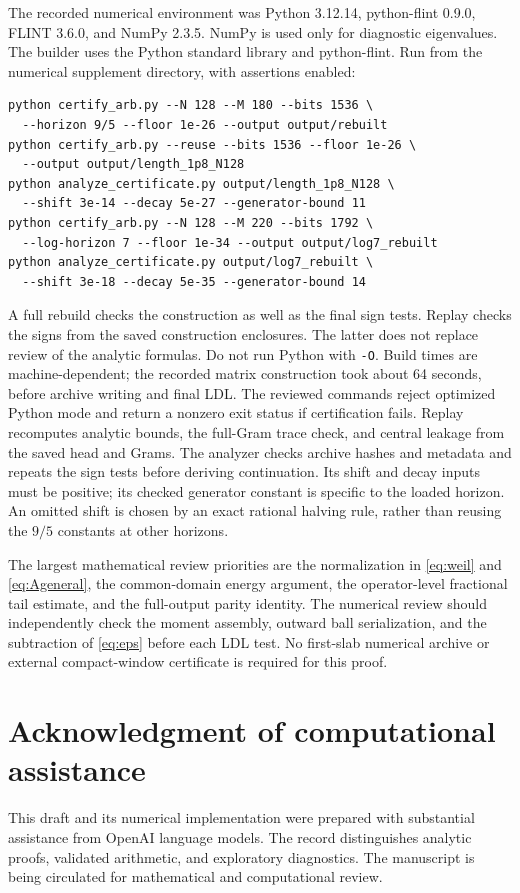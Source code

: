 \documentclass[11pt]{article}
\numberwithin{equation}{section}
\theoremstyle{definition}
\theoremstyle{remark}
\begin{document}
The recorded numerical environment was Python 3.12.14, python-flint 0.9.0,
FLINT 3.6.0, and NumPy 2.3.5. NumPy is used only for diagnostic eigenvalues.
The builder uses the Python standard library and python-flint. Run from
the numerical supplement directory, with assertions enabled:
\begin{verbatim}
python certify_arb.py --N 128 --M 180 --bits 1536 \
  --horizon 9/5 --floor 1e-26 --output output/rebuilt
python certify_arb.py --reuse --bits 1536 --floor 1e-26 \
  --output output/length_1p8_N128
python analyze_certificate.py output/length_1p8_N128 \
  --shift 3e-14 --decay 5e-27 --generator-bound 11
python certify_arb.py --N 128 --M 220 --bits 1792 \
  --log-horizon 7 --floor 1e-34 --output output/log7_rebuilt
python analyze_certificate.py output/log7_rebuilt \
  --shift 3e-18 --decay 5e-35 --generator-bound 14
\end{verbatim}
A full rebuild checks the construction as well as the final sign tests.
Replay checks the signs from the saved construction enclosures. The latter
does not replace review of the analytic formulas. Do not run Python with
\texttt{-O}. Build times are machine-dependent; the recorded matrix
construction took about 64 seconds, before archive writing and final LDL.
The reviewed commands reject optimized Python mode and return a nonzero
exit status if certification fails. Replay recomputes analytic bounds,
the full-Gram trace check, and central leakage from the saved head and Grams.
The analyzer checks archive hashes and metadata and repeats the sign tests
before deriving continuation. Its shift and decay inputs must be positive;
its checked generator constant is specific to the loaded horizon. An omitted
shift is chosen by an exact rational halving rule, rather than reusing the
$9/5$ constants at other horizons.

The largest mathematical review priorities are the normalization in
\eqref{eq:weil} and \eqref{eq:Ageneral}, the common-domain energy argument,
the operator-level fractional tail estimate, and the full-output parity
identity. The numerical review should independently check the moment
assembly, outward ball serialization, and the subtraction of
\eqref{eq:eps} before each LDL test. No first-slab numerical archive or
external compact-window certificate is required for this proof.

\section*{Acknowledgment of computational assistance}
This draft and its numerical implementation were prepared with substantial
assistance from OpenAI language models. The record distinguishes analytic
proofs, validated arithmetic, and exploratory diagnostics. The manuscript
is being circulated for mathematical and computational review.



\end{document}
